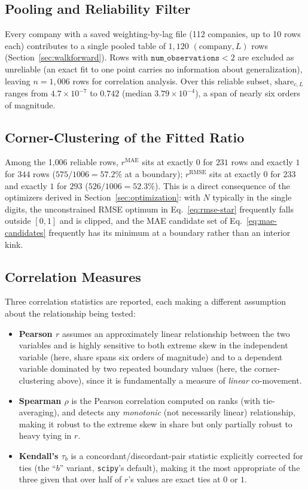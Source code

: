 \documentclass[11pt]{article}
\newcommand{\rmae}{r^{\text{MAE}}}
\newcommand{\rrmse}{r^{\text{RMSE}}}
\begin{document}
\subsection{Pooling and Reliability Filter}

Every company with a saved weighting-by-lag file (112 companies, up to 10 rows each) contributes
to a single pooled table of $1{,}120$ $(\text{company},L)$ rows (Section~\ref{sec:walkforward}).
Rows with $\texttt{num\_observations} < 2$ are excluded as unreliable (an exact fit to one point
carries no information about generalization), leaving $n=1{,}006$ rows for correlation analysis.
Over this reliable subset, $\text{share}_{c,L}$ ranges from $4.7\times10^{-7}$ to $0.742$ (median
$3.79\times10^{-4}$), a span of nearly six orders of magnitude.

\subsection{Corner-Clustering of the Fitted Ratio}

Among the 1{,}006 reliable rows, $\rmae$ sits at exactly $0$ for $231$ rows and exactly $1$ for
$344$ rows ($575/1006 = 57.2\%$ at a boundary); $\rrmse$ sits at exactly $0$ for $233$ and exactly
$1$ for $293$ ($526/1006=52.3\%$). This is a direct consequence of the optimizers derived in
Section~\ref{sec:optimization}: with $N$ typically in the single digits, the unconstrained RMSE
optimum in Eq.~\eqref{eq:rmse-star} frequently falls outside $[0,1]$ and is clipped, and the MAE
candidate set of Eq.~\eqref{eq:mae-candidates} frequently has its minimum at a boundary rather
than an interior kink.

\subsection{Correlation Measures}

Three correlation statistics are reported, each making a different assumption about the
relationship being tested:

\begin{itemize}
\item \textbf{Pearson $r$} assumes an approximately linear relationship between the two variables
  and is highly sensitive to both extreme skew in the independent variable (here, share spans six
  orders of magnitude) and to a dependent variable dominated by two repeated boundary values
  (here, the corner-clustering above), since it is fundamentally a measure of \emph{linear}
  co-movement.
\item \textbf{Spearman $\rho$} is the Pearson correlation computed on ranks (with tie-averaging),
  and detects any \emph{monotonic} (not necessarily linear) relationship, making it robust to the
  extreme skew in share but only partially robust to heavy tying in $r$.
\item \textbf{Kendall's $\tau_b$} is a concordant/discordant-pair statistic explicitly corrected
  for ties (the ``$b$'' variant, \texttt{scipy}'s default), making it the most appropriate of the
  three given that over half of $r$'s values are exact ties at $0$ or $1$.
\end{itemize}
\end{document}
